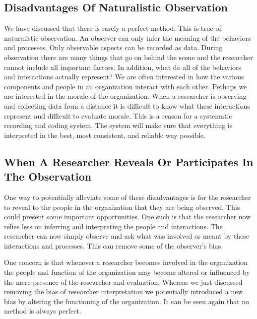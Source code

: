 \documentclass[]{book}
\theoremstyle{definition}
\theoremstyle{definition}
\theoremstyle{definition}
\theoremstyle{remark}
\begin{document}
\hypertarget{disadvantages-of-naturalistic-observation}{%
\subsection{Disadvantages Of Naturalistic
Observation}\label{disadvantages-of-naturalistic-observation}}

We have discussed that there is rarely a perfect method. This is true of
naturalistic observation. An observer can only infer the meaning of the
behaviors and processes. Only observable aspects can be recorded as
data. During observation there are many things that go on behind the
scene and the researcher cannot include all important factors. In
addition, what do all of the behaviors and interactions actually
represent? We are often interested in how the various components and
people in an organization interact with each other. Perhaps we are
interested in the morale of the organization. When a researcher is
observing and collecting data from a distance it is difficult to know
what these interactions represent and difficult to evaluate morale. This
is a reason for a systematic recording and coding system. The system
will make sure that everything is interpreted in the best, most
consistent, and reliable way possible.

\hypertarget{when-a-researcher-reveals-or-participates-in-the-observation}{%
\subsection{When A Researcher Reveals Or Participates In The
Observation}\label{when-a-researcher-reveals-or-participates-in-the-observation}}

One way to potentially alleviate some of these disadvantages is for the
researcher to reveal to the people in the organization that they are
being observed. This could present some important opportunities. One
such is that the researcher now relies less on inferring and
interpreting the people and interactions. The researcher can now simply
observe and ask what was involved or meant by these interactions and
processes. This can remove some of the observer's bias.

One concern is that whenever a researcher becomes involved in the
organization the people and function of the organization may become
altered or influenced by the mere presence of the researcher and
evaluation. Whereas we just discussed removing the bias of researcher
interpretation we potentially introduced a new bias by altering the
functioning of the organization. It can be seen again that no method is
always perfect.
\end{document}
